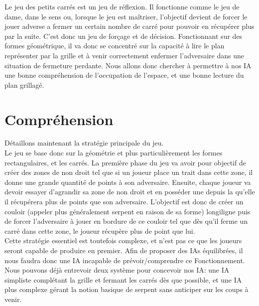 \documentclass[a4paper,12pt]{report}
\begin{document}
Le jeu des petits carr\'es est un jeu de r\'eflexion. Il fonctionne comme le jeu de dame, dans le sens ou, lorsque le jeu est ma\^itriser, l'objectif devient de forcer le jouer adverse a fermer un certain nombre de carr\'e pour pouvoir en r\'ecup\'erer plus par la suite. C'est donc un jeu de for\c{c}age et de d\'ecision. Fonctionnant sur des formes g\'eom\'etrique, il va donc se concentr\'e sur la capacit\'e \`a lire le plan repr\'esenter par la grille et \`a venir correctement enfermer l'adversaire dans une situation de fermeture perdante. Nous allons donc chercher \`a permettre \`a nos IA une bonne compr\'ehension de l'occupation de l'espace, et une bonne lecture du plan grillag\'e.

\section{Compr\'ehension}

D\'etaillons maintenant la strat\'egie principale du jeu.\\
Le jeu se base donc sur la g\'eom\'etrie et plus particuli\`erement les formes rectangulaires, et les carr\'es. La premi\`ere phase du jeu va avoir pour objectif de cr\'eer des zones de \og{}non droit\fg{} tel que si un joueur place un trait dans cette zone, il donne une grande quantit\'e de points \`a son adversaire. Ensuite, chaque joueur va devoir essayer d'agrandir sa zone de non droit et en \og{}poss\'eder\fg{} une depuis la qu'elle il r\'ecup\'erera plus de points que son adversaire. L'objectif est donc de cr\'eer un couloir (appeler plus g\'en\'eralement \og{}serpent\fg{} en raison de sa forme) longiligne puis de forcer l'adversaire \`a jouer en bordure de ce couloir tel que d\`es qu'il ferme un carr\'e dans cette zone, le joueur r\'ecup\`ere plus de point que lui. \\
Cette strat\'egie essentiel est toutefois complexe, et n'est pas ce que les joueurs seront capable de produire en premier. Afin de proposer des IAs \'equilibr\'ees,  il nous faudra donc une IA incapable de pr\'evoir/comprendre ce Fonctionnement. \\
Nous pouvons d\'ej\`a entrevoir deux syst\`eme pour concevoir nos IA: une IA simpliste compl\'etant la grille et fermant les carr\'es d\`es que possible, et une IA plus complexe g\'erant la notion basique de serpent sans anticiper sur les coups \`a venir.
\end{document}
